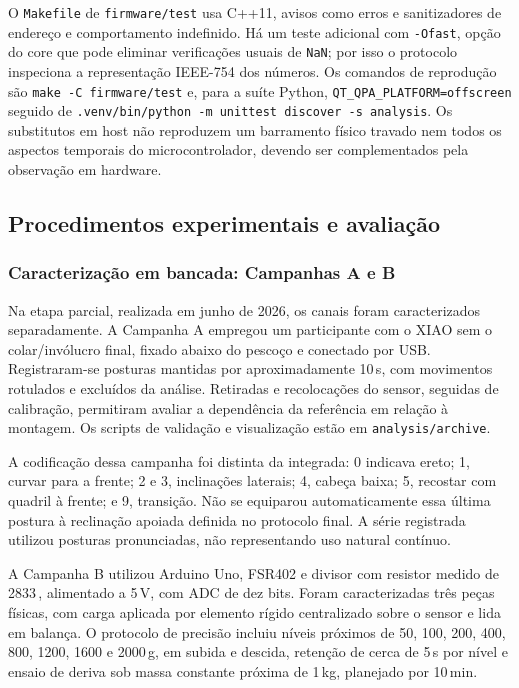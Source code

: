O \texttt{Makefile} de \texttt{firmware/test} usa C++11, avisos como
erros e sanitizadores de endereço e comportamento indefinido. Há um
teste adicional com \texttt{-Ofast}, opção do core que pode eliminar
verificações usuais de \texttt{NaN}; por isso o protocolo inspeciona a
representação IEEE-754 dos números. Os comandos de reprodução são
\texttt{make -C firmware/test} e, para a suíte Python,
\texttt{QT\_QPA\_PLATFORM=offscreen} seguido de
\texttt{.venv/bin/python -m unittest discover -s analysis}.
Os substitutos em host não reproduzem um barramento físico travado
nem todos os aspectos temporais do microcontrolador, devendo ser
complementados pela observação em hardware.

\subsection{Procedimentos experimentais e avaliação}
\label{sec:met-experimentos}

\subsubsection{Caracterização em bancada: Campanhas A e B}

Na etapa parcial, realizada em junho de 2026, os canais foram
caracterizados separadamente. A Campanha A empregou um participante
com o XIAO sem o colar/invólucro final, fixado abaixo do pescoço e
conectado por USB. Registraram-se posturas mantidas por aproximadamente
10\,s, com movimentos rotulados e excluídos da análise. Retiradas e
recolocações do sensor, seguidas de calibração, permitiram avaliar a
dependência da referência em relação à montagem. Os scripts de
validação e visualização estão em \texttt{analysis/archive}.

A codificação dessa campanha foi distinta da integrada: 0 indicava
ereto; 1, curvar para a frente; 2 e 3, inclinações laterais; 4,
cabeça baixa; 5, recostar com quadril à frente; e 9, transição.
Não se equiparou automaticamente essa última postura à reclinação
apoiada definida no protocolo final. A série registrada utilizou
posturas pronunciadas, não representando uso natural contínuo.

A Campanha B utilizou Arduino Uno, FSR402 e divisor com resistor
medido de 2833\,\ohm, alimentado a 5\,V, com ADC de dez bits.
Foram caracterizadas três peças físicas, com carga aplicada por
elemento rígido centralizado sobre o sensor e lida em balança.
O protocolo de precisão incluiu níveis próximos de 50, 100, 200, 400,
800, 1200, 1600 e 2000\,g, em subida e descida, retenção de cerca
de 5\,s por nível e ensaio de deriva sob massa constante próxima
de 1\,kg, planejado por 10\,min.

